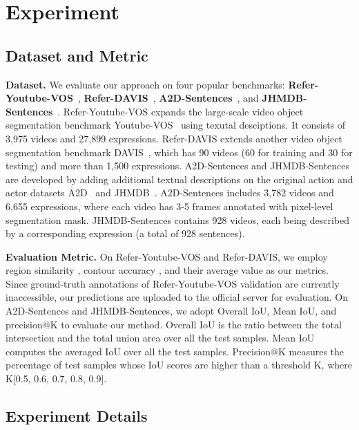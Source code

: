 \documentclass[10pt,twocolumn,letterpaper]{article}
\begin{document}
\section{Experiment}

\subsection{Dataset and Metric}
\noindent \textbf{Dataset.}
We evaluate our approach on four popular benchmarks: \textbf{Refer-Youtube-VOS}~\cite{URVOS}, \textbf{Refer-DAVIS}~\cite{khoreva2019video}, \textbf{A2D-Sentences}~\cite{gavrilyuk2018actor}, and \textbf{JHMDB-Sentences}~\cite{gavrilyuk2018actor}.
{Refer-Youtube-VOS} expands the large-scale video object segmentation benchmark Youtube-VOS~\cite{xu2018youtube} using texutal desciptions. It consists of 3,975 videos and  27,899 expressions. 
{Refer-DAVIS} extends another video object segmentation benchmark DAVIS~\cite{pont20172017}, which has 90 videos (60 for training and 30 for testing) and more than 1,500 expressions.
A2D-Sentences and JHMDB-Sentences are developed by adding additional textual descriptions on the original action and actor datasets A2D~\cite{xu2015can} and JHMDB~\cite{jhuang2013towards}.
A2D-Sentences includes 3,782 videos and 6,655 expressions, where each video has 3-5 frames annotated with pixel-level segmentation mask.
JHMDB-Sentences contains 928 videos, each being described by a corresponding expression (a total of 928 sentences).

\noindent\textbf{Evaluation Metric.}
On Refer-Youtube-VOS and Refer-DAVIS, we employ region similarity , contour accuracy , and their average value  as our metrics.
Since  ground-truth annotations of Refer-Youtube-VOS validation are currently inaccessible, our predictions are uploaded to the official server for evaluation.
On A2D-Sentences and JHMDB-Sentences, we  adopt  Overall IoU, Mean IoU, and precision@K to evaluate our method. Overall IoU is the ratio between the total intersection and the total union area over all the test samples. Mean IoU computes the averaged IoU over all the test samples. 
Precision@K measures the percentage of test samples whose IoU scores are higher than a threshold K, where K[0.5, 0.6, 0.7, 0.8, 0.9].







\subsection{Experiment Details}
\end{document}
